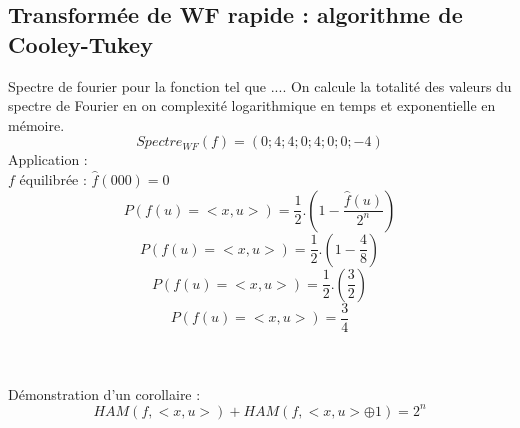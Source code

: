 \subsection{Transformée de WF rapide : algorithme de Cooley-Tukey}
Spectre de fourier pour la fonction tel que $...$. On calcule la totalité des valeurs du spectre de Fourier en on complexité logarithmique en temps et exponentielle en mémoire.\\
\begin{equation}
 Spectre_{WF}(f)=(0;4;4;0;4;0;0;-4)
\end{equation}
Application :\\
$f$ équilibrée : $\hat{f}(000)=0$\\
\begin{equation}
 P(f(u)=<x,u>)=\frac{1}{2}.\left(1-\frac{\hat{f}(u)}{2^n}\right)
\end{equation}
\begin{equation}
 P(f(u)=<x,u>)=\frac{1}{2}.\left(1-\frac{4}{8}\right)
\end{equation}
\begin{equation}
 P(f(u)=<x,u>)=\frac{1}{2}.\left(\frac{3}{2}\right)
\end{equation}
\begin{equation}
 P(f(u)=<x,u>)=\frac{3}{4}
\end{equation}~\\~\\
\begin{exo}
 Démonstration d'un corollaire :
 \begin{equation}
  HAM(f,<x,u>)+HAM(f,<x,u>\oplus1)=2^n
 \end{equation}
\end{exo}
